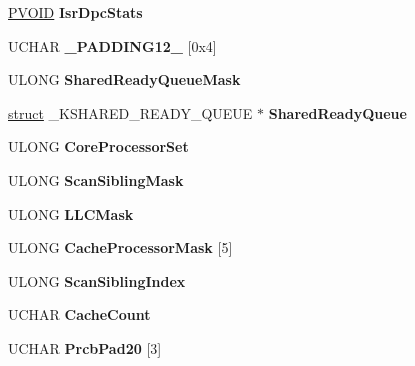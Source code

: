 \begin{DoxyCompactItemize}
\hyperlink{interfacevoid}{P\+V\+O\+ID} {\bfseries Isr\+Dpc\+Stats}
\item 
\mbox{\label{struct___k_p_r_c_b_ab2bb6d23f91fd6a45652d8ca4ea4c780}} 
U\+C\+H\+AR {\bfseries \+\_\+\+P\+A\+D\+D\+I\+N\+G12\+\_\+} \mbox{[}0x4\mbox{]}
\item 
\mbox{\label{struct___k_p_r_c_b_a08c4708deabbd761ce4407d08d078b81}} 
U\+L\+O\+NG {\bfseries Shared\+Ready\+Queue\+Mask}
\item 
\mbox{\label{struct___k_p_r_c_b_ac4bf0c9d289617a7c584a602c2364bd6}} 
\hyperlink{interfacestruct}{struct} \+\_\+\+K\+S\+H\+A\+R\+E\+D\+\_\+\+R\+E\+A\+D\+Y\+\_\+\+Q\+U\+E\+UE $\ast$ {\bfseries Shared\+Ready\+Queue}
\item 
\mbox{\label{struct___k_p_r_c_b_ab0c368a41508553adf0900de4cf0e0d1}} 
U\+L\+O\+NG {\bfseries Core\+Processor\+Set}
\item 
\mbox{\label{struct___k_p_r_c_b_a6c8011e34c6511885b6eb4a9d5ce2a88}} 
U\+L\+O\+NG {\bfseries Scan\+Sibling\+Mask}
\item 
\mbox{\label{struct___k_p_r_c_b_a96f6d2a0afa2348bc35d27cd7a383012}} 
U\+L\+O\+NG {\bfseries L\+L\+C\+Mask}
\item 
\mbox{\label{struct___k_p_r_c_b_afff3d071bfdebb318b30775a0b30ff80}} 
U\+L\+O\+NG {\bfseries Cache\+Processor\+Mask} \mbox{[}5\mbox{]}
\item 
\mbox{\label{struct___k_p_r_c_b_a6d9c074fe1bba12f1dc620ba6f164a84}} 
U\+L\+O\+NG {\bfseries Scan\+Sibling\+Index}
\item 
\mbox{\label{struct___k_p_r_c_b_a7177ddc99f82856b1a84043394af51cd}} 
U\+C\+H\+AR {\bfseries Cache\+Count}
\item 
\mbox{\label{struct___k_p_r_c_b_aab8d2c51da2296f9db3de864d6f2610d}} 
U\+C\+H\+AR {\bfseries Prcb\+Pad20} \mbox{[}3\mbox{]}
\item 
\mbox{\label{struct___k_p_r_c_b_ab98e01cc9a264751c03aa2aec70caec5}} 

\end{DoxyCompactItemize}
